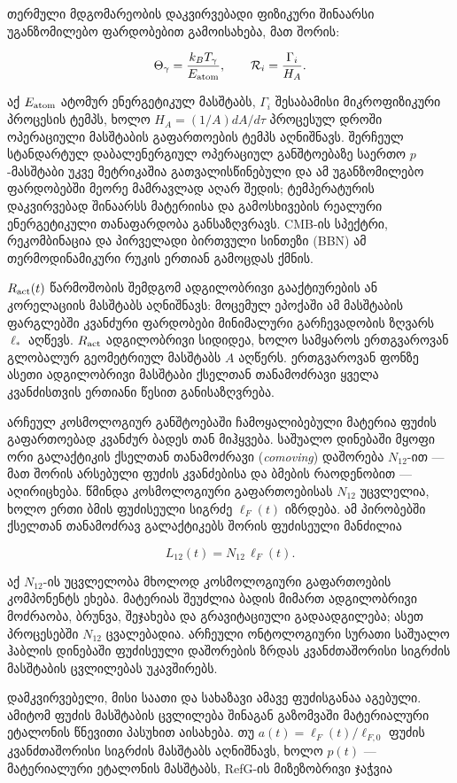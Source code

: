 \documentclass[11pt,a4paper]{article}
\begin{document}
თერმული მდგომარეობის დაკვირვებადი ფიზიკური შინაარსი უგანზომილებო ფარდობებით გამოისახება, მათ შორის:

\[
\Theta_\gamma=\frac{k_B T_\gamma}{E_{\rm atom}}, \qquad
\mathcal{R}_i=\frac{\Gamma_i}{H_A}.
\]

აქ $E_{\rm atom}$ ატომურ ენერგეტიკულ მასშტაბს, $\Gamma_i$ შესაბამისი მიკროფიზიკური პროცესის ტემპს, ხოლო $H_A=(1/A)dA/d\tau$ პროცესულ დროში ოპერაციული მასშტაბის გაფართოების ტემპს აღნიშნავს. შერჩეულ სტანდარტულ დაბალენერგიულ ოპერაციულ განშტოებაზე საერთო $p$-მასშტაბი უკვე მეტრიკაშია გათვალისწინებული და ამ უგანზომილებო ფარდობებში მეორე მამრავლად აღარ შედის; ტემპერატურის დაკვირვებად შინაარსს მატერიისა და გამოსხივების რეალური ენერგეტიკული თანაფარდობა განსაზღვრავს. CMB-ის სპექტრი, რეკომბინაცია და პირველადი ბირთვული სინთეზი (BBN) ამ თერმოდინამიკური რუკის ერთიან გამოცდას ქმნის.

$R_{\rm act}(t)$ წარმოშობის შემდგომ ადგილობრივი გააქტიურების ან კორელაციის მასშტაბს აღნიშნავს: მოცემულ ეპოქაში ამ მასშტაბის ფარგლებში კვანძური ფარდობები მინიმალური გარჩევადობის ზღვარს $\ell_*$ აღწევს. $R_{\rm act}$ ადგილობრივი სიდიდეა, ხოლო სამყაროს ერთგვაროვან გლობალურ გეომეტრიულ მასშტაბს $A$ აღწერს. ერთგვაროვან ფონზე ასეთი ადგილობრივი მასშტაბი ქსელთან თანამოძრავი ყველა კვანძისთვის ერთიანი წესით განისაზღვრება.

არჩეულ კოსმოლოგიურ განშტოებაში ჩამოყალიბებული მატერია ფუძის გაფართოებად კვანძურ ბადეს თან მიჰყვება. საშუალო დინებაში მყოფი ორი გალაქტიკის ქსელთან თანამოძრავი (\emph{comoving}) დაშორება $N_{12}$-ით — მათ შორის არსებული ფუძის კვანძებისა და ბმების რაოდენობით — აღირიცხება. წმინდა კოსმოლოგიური გაფართოებისას $N_{12}$ უცვლელია, ხოლო ერთი ბმის ფუძისეული სიგრძე $\ell_F(t)$ იზრდება. ამ პირობებში ქსელთან თანამოძრავ გალაქტიკებს შორის ფუძისეული მანძილია

\[
L_{12}(t)=N_{12}\,\ell_F(t).
\]

აქ $N_{12}$-ის უცვლელობა მხოლოდ კოსმოლოგიური გაფართოების კომპონენტს ეხება. მატერიას შეუძლია ბადის მიმართ ადგილობრივი მოძრაობა, ბრუნვა, შეჯახება და გრავიტაციული გადაადგილება; ასეთ პროცესებში $N_{12}$ ცვალებადია. არჩეული ონტოლოგიური სურათი საშუალო ჰაბლის დინებაში ფუძისეული დაშორების ზრდას კვანძთაშორისი სიგრძის მასშტაბის ცვლილებას უკავშირებს.

დამკვირვებელი, მისი საათი და სახაზავი ამავე ფუძისგანაა აგებული. ამიტომ ფუძის მასშტაბის ცვლილება შინაგან გაზომვაში მატერიალური ეტალონის წნევითი პასუხით აისახება. თუ $a(t)=\ell_F(t)/\ell_{F,0}$ ფუძის კვანძთაშორისი სიგრძის მასშტაბს აღნიშნავს, ხოლო $p(t)$ — მატერიალური ეტალონის მასშტაბს, RefG-ის მიზეზობრივი ჯაჭვია
\end{document}
